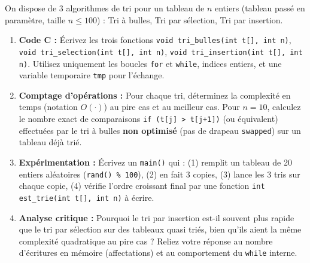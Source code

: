\documentclass[11pt]{article}
\begin{document}
\begin{exercice}
On dispose de 3 algorithmes de tri pour un tableau de $n$ entiers (tableau passé en paramètre, taille $n \le 100$) : Tri à bulles, Tri par sélection, Tri par insertion.
\begin{enumerate}
    \item \textbf{Code C :} Écrivez les trois fonctions \texttt{void tri\_bulles(int t[], int n)}, \texttt{void tri\_selection(int t[], int n)}, \texttt{void tri\_insertion(int t[], int n)}. Utilisez uniquement les boucles \texttt{for} et \texttt{while}, indices entiers, et une variable temporaire \texttt{tmp} pour l'échange.
    \item \textbf{Comptage d'opérations :} Pour chaque tri, déterminez la complexité en temps (notation $O(\cdot)$) au pire cas et au meilleur cas. Pour $n=10$, calculez le nombre exact de comparaisons \texttt{if (t[j] > t[j+1])} (ou équivalent) effectuées par le tri à bulles \textbf{non optimisé} (pas de drapeau \texttt{swapped}) sur un tableau déjà trié.
    \item \textbf{Expérimentation :} Écrivez un \texttt{main()} qui : (1) remplit un tableau de 20 entiers aléatoires (\texttt{rand() \% 100}), (2) en fait 3 copies, (3) lance les 3 tris sur chaque copie, (4) vérifie l'ordre croissant final par une fonction \texttt{int est\_trie(int t[], int n)} à écrire.
    \item \textbf{Analyse critique :} Pourquoi le tri par insertion est-il souvent plus rapide que le tri par sélection sur des tableaux quasi triés, bien qu'ils aient la même complexité quadratique au pire cas ? Reliez votre réponse au nombre d'écritures en mémoire (affectations) et au comportement du \texttt{while} interne.
\end{enumerate}
\end{exercice}
\end{document}
